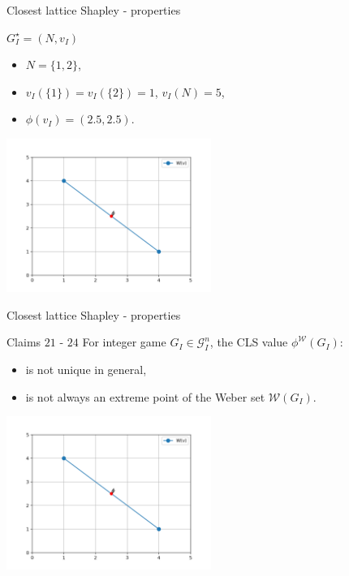 \documentclass{beamer}
\begin{document}


\begin{frame}{Closest lattice Shapley - properties}

    \begin{block}{$G_I^{\star}=(N,v_I)$}
        \begin{itemize}
            \item $N=\{1,2\}$,
            \item $v_I(\{1\})=v_I(\{2\})=1$, $v_I(N)=5$,
            \item $\phi(v_I)=(2.5,2.5)$.
        \end{itemize}
    \end{block}

    \centering
    \includegraphics[height=5cm]{../img/figure_weber_set_example.png}
\end{frame}



\begin{frame}{Closest lattice Shapley - properties}

    \begin{block}{Claims $21$ - $24$}
        For integer game $G_I \in \mathcal{G}_I^n$, the CLS value $\phi^\mathcal{W}(G_I)$:
        \begin{itemize}
            \item is not unique in general,
            \item is not always an extreme point of the Weber set $\mathcal{W}(G_I)$.
        \end{itemize}
    \end{block}

    \centering
    \includegraphics[height=5cm]{../img/figure_weber_set_example.png}
\end{frame}
\end{document}

